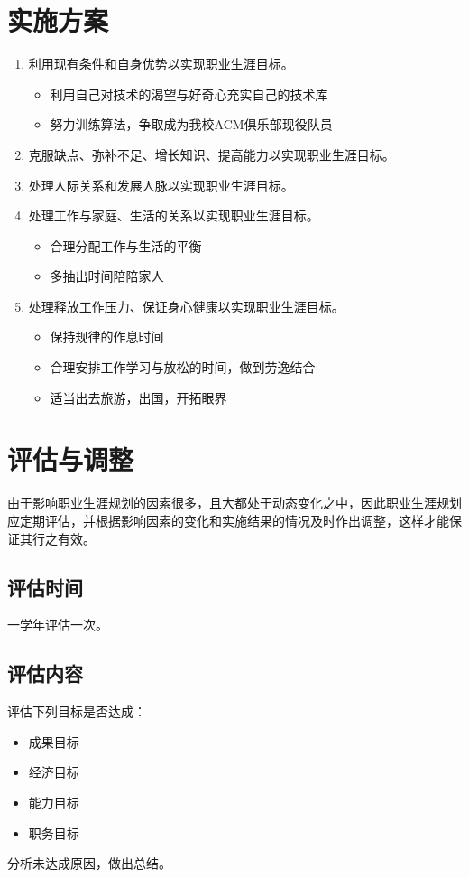 \documentclass{article}
\begin{document}
\section{实施方案}
\begin{enumerate}[1、]
	\item 利用现有条件和自身优势以实现职业生涯目标。
\begin{itemize}
    \item 利用自己对技术的渴望与好奇心充实自己的技术库
    \item 努力训练算法，争取成为我校ACM俱乐部现役队员
\end{itemize}
	\item 克服缺点、弥补不足、增长知识、提高能力以实现职业生涯目标。
	\item 处理人际关系和发展人脉以实现职业生涯目标。
	\item 处理工作与家庭、生活的关系以实现职业生涯目标。
\begin{itemize}
    \item 合理分配工作与生活的平衡
    \item 多抽出时间陪陪家人
\end{itemize}

	\item 处理释放工作压力、保证身心健康以实现职业生涯目标。
\begin{itemize}
   \item 保持规律的作息时间
    \item 合理安排工作学习与放松的时间，做到劳逸结合
    \item 适当出去旅游，出国，开拓眼界
\end{itemize}

\end{enumerate}
\par 

\section{评估与调整}
由于影响职业生涯规划的因素很多，且大都处于动态变化之中，因此职业生涯规划应定期评估，并根据影响因素的变化和实施结果的情况及时作出调整，这样才能保证其行之有效。\par 
\subsection{评估时间}
	一学年评估一次。
\subsection{评估内容}
评估下列目标是否达成：
\begin{itemize}
\item 成果目标
\item 经济目标
\item 能力目标
\item 职务目标
\end{itemize}	
	分析未达成原因，做出总结。
\end{document}
